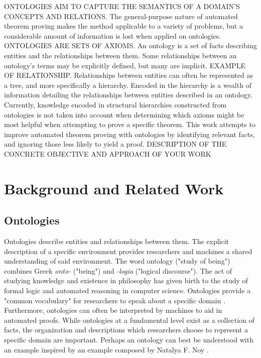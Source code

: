 \documentclass{article}
\begin{document}
ONTOLOGIES AIM TO CAPTURE THE SEMANTICS OF A DOMAIN'S CONCEPTS AND RELATIONS. The general-purpose nature of automated theorem proving makes the method applicable to a variety of problems, but a considerable amount of information is lost when applied on ontologies. ONTOLOGIES ARE SETS OF AXIOMS. An ontology is a set of facts describing entities and the relationships between them. Some relationships between an ontology's terms may be explicitly defined, but many are implicit. EXAMPLE OF RELATIONSHIP. Relationships between entities can often be represented as a tree, and more specifically a hierarchy. Encoded in the hierarchy is a wealth of information detailing the relationships between entities described in an ontology. Currently, knowledge encoded in structural hierarchies constructed from ontologies is not taken into account when determining which axioms might be most helpful when attempting to prove a specific theorem. This work attempts to improve automated theorem proving with ontologies by identifying relevant facts, and ignoring those less likely to yield a proof. DESCRIPTION OF THE CONCRETE OBJECTIVE AND APPROACH OF YOUR WORK


	\newpage
	\section{Background and Related Work}

		\subsection{Ontologies}
		
Ontologies describe entities and relationships between them. The explicit description of a specific environment provides researchers and machines a shared understanding of said environment. The word ontology ("study of being") combines Greek \textit{onto-} ("being") and \textit{-logia} ("logical discourse"). The act of studying knowledge and existence in philosophy has given birth to the study of formal logic and automated reasoning in computer science. Ontologies provide a "common vocabulary" for researchers to speak about a specific domain \cite{noy2001ontology}. Furthermore, ontologies can often be interpreted by machines to aid in automated proofs. While ontologies at a fundamental level exist as a collection of facts, the organization and descriptions which researchers choose to represent a specific domain are important. Perhaps an ontology can best be understood with an example inspired by an example composed by Natalya F. Noy \cite{noy2001ontology}. 
\end{document}
